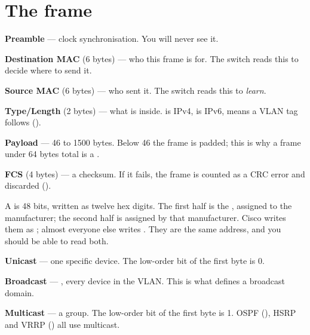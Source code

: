 \section{The frame}

\begin{definitionbox}
\begin{tight}
  \item \textbf{Preamble} --- clock synchronisation. You will never see it.
  \item \textbf{Destination MAC} (6 bytes) --- who this frame is for. The switch
        reads this to decide where to send it.
  \item \textbf{Source MAC} (6 bytes) --- who sent it. The switch reads this
        to \emph{learn}.
  \item \textbf{Type/Length} (2 bytes) --- what is inside.  is IPv4,
         is IPv6,  means a VLAN tag follows
        ().
  \item \textbf{Payload} --- 46 to 1500 bytes. Below 46 the frame is padded;
        this is why a frame under 64 bytes total is a .
  \item \textbf{FCS} (4 bytes) --- a checksum. If it fails, the frame is counted
        as a CRC error and discarded ().
\end{tight}
\end{definitionbox}

A  is 48 bits, written as twelve hex digits. The first half is
the , assigned to the manufacturer; the second half is assigned by that
manufacturer. Cisco writes them as ; almost everyone else
writes . They are the same address, and you should be able
to read both.

\begin{conceptbox}
\begin{tight}
  \item \textbf{Unicast} --- one specific device. The low-order bit of the first
        byte is 0.
  \item \textbf{Broadcast} --- , every device in the VLAN.
        This is what defines a broadcast domain.
  \item \textbf{Multicast} --- a group. The low-order bit of the first byte is 1.
        OSPF (), HSRP and VRRP () all use multicast.
\end{tight}
\end{conceptbox}

